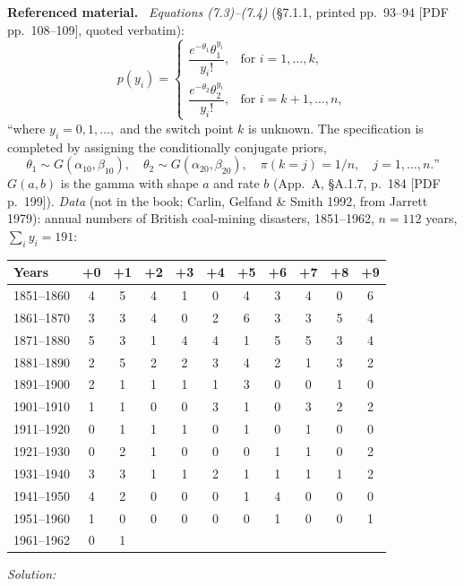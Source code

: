 \documentclass[11pt,a4paper]{article}
\newif\ifsolucoes
\newcommand{\espacoresol}{4.5cm}   %
\numberwithin{equation}{questao}   %
\newenvironment{refmat}{\par\smallskip\noindent\small\textbf{Referenced material.}\ }{\par\smallskip}
\newcommand{\resolespaco}{\ifsolucoes\else\par\textit{Solution:}\vspace{\espacoresol}\par\fi}
\begin{document}
\begin{refmat}
\emph{Equations (7.3)--(7.4)} (§7.1.1, printed pp.~93--94 [PDF pp.~108--109], quoted verbatim):
\[
p(y_i)=\begin{cases}\dfrac{e^{-\theta_1}\theta_1^{y_i}}{y_i!}, & \text{for } i=1,\dots,k,\\[8pt]
\dfrac{e^{-\theta_2}\theta_2^{y_i}}{y_i!}, & \text{for } i=k+1,\dots,n,\end{cases}\tag{7.3}
\]
``where $y_i=0,1,\dots,$ and the switch point $k$ is unknown. The specification is completed by
assigning the conditionally conjugate priors,
\[
\theta_1\sim G(\alpha_{10},\beta_{10}),\quad \theta_2\sim G(\alpha_{20},\beta_{20}),\quad
\pi(k=j)=1/n,\quad j=1,\dots,n.\text{''}\tag{7.4}
\]
$G(a,b)$ is the gamma with shape $a$ and rate $b$ (App.~A, §A.1.7, p.~184 [PDF p.~199]).
\emph{Data} (not in the book; Carlin, Gelfand \& Smith 1992, from Jarrett 1979): annual numbers of
British coal-mining disasters, 1851--1962, $n=112$ years, $\sum_iy_i=191$:
\begin{center}\footnotesize\setlength{\tabcolsep}{4pt}
\begin{tabular}{l*{10}{c}}
\toprule
Years & +0 & +1 & +2 & +3 & +4 & +5 & +6 & +7 & +8 & +9\\
\midrule
1851--1860 & 4 & 5 & 4 & 1 & 0 & 4 & 3 & 4 & 0 & 6 \\
1861--1870 & 3 & 3 & 4 & 0 & 2 & 6 & 3 & 3 & 5 & 4 \\
1871--1880 & 5 & 3 & 1 & 4 & 4 & 1 & 5 & 5 & 3 & 4 \\
1881--1890 & 2 & 5 & 2 & 2 & 3 & 4 & 2 & 1 & 3 & 2 \\
1891--1900 & 2 & 1 & 1 & 1 & 1 & 3 & 0 & 0 & 1 & 0 \\
1901--1910 & 1 & 1 & 0 & 0 & 3 & 1 & 0 & 3 & 2 & 2 \\
1911--1920 & 0 & 1 & 1 & 1 & 0 & 1 & 0 & 1 & 0 & 0 \\
1921--1930 & 0 & 2 & 1 & 0 & 0 & 0 & 1 & 1 & 0 & 2 \\
1931--1940 & 3 & 3 & 1 & 1 & 2 & 1 & 1 & 1 & 1 & 2 \\
1941--1950 & 4 & 2 & 0 & 0 & 0 & 1 & 4 & 0 & 0 & 0 \\
1951--1960 & 1 & 0 & 0 & 0 & 0 & 0 & 1 & 0 & 0 & 1 \\
1961--1962 & 0 & 1 &   &   &   &   &   &   &   &   \\
\bottomrule
\end{tabular}
\end{center}
\end{refmat}
\resolespaco
\end{document}

